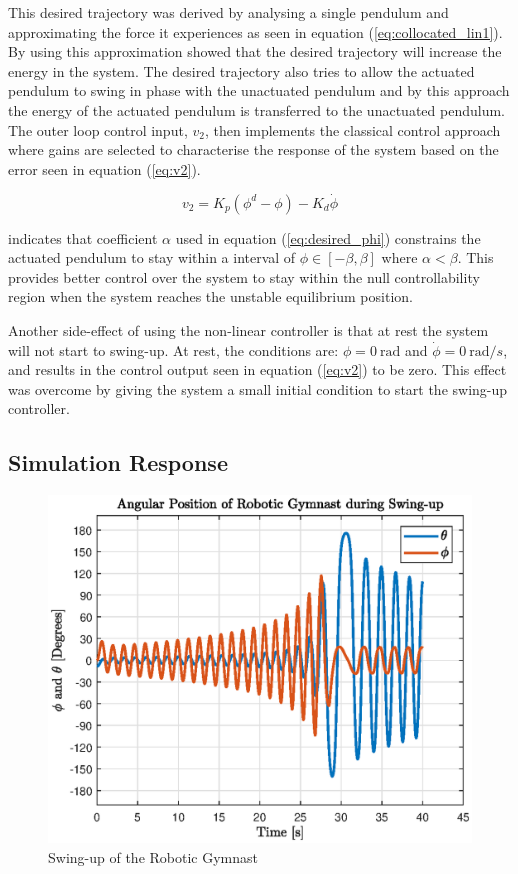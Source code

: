 This desired trajectory was derived by analysing a single pendulum and approximating the force it experiences as seen in equation (\ref{eq:collocated_lin1}). By using this approximation \citeauthor{spong_swingup} showed that the desired trajectory will increase the energy in the system. The desired trajectory also tries to allow the actuated pendulum to swing in phase with the unactuated pendulum  and by this approach the energy of the actuated pendulum is transferred to the unactuated pendulum.\\

The outer loop control input, $v_{2}$, then implements the classical control approach where gains are selected to characterise the response of the system based on the error seen in equation (\ref{eq:v2}). 

   
\begin{equation} \label{eq:v2}
v_{2} = K_{p}(\phi^{d}-\phi)-K_{d}\dot{\phi}
\end{equation}

\citeauthor{spong_swingup} indicates that coefficient $\alpha$ used in equation (\ref{eq:desired_phi}) constrains the actuated pendulum to stay within a interval of $ \phi \in [-\beta,\beta]$ where $\alpha < \beta$. This provides better control over the system to stay within the null controllability region when the system reaches the unstable equilibrium position.

Another side-effect of using the non-linear controller is that at rest the system will not start to swing-up. At rest, the conditions are: $\phi = \SI{0}{\radian}$ and $\dot{\phi} = \SI{0}{\radian/s}$, and results in the control output seen in equation (\ref{eq:v2}) to be zero. This effect was overcome by giving the system a small initial condition to start the swing-up controller.


\subsection{Simulation Response}
\begin{figure}[h]
	\centering
	\includegraphics[scale=1]{./figs/swingup}
	\caption{Swing-up of the Robotic Gymnast}
	\label{fig:swingup}
\end{figure}

